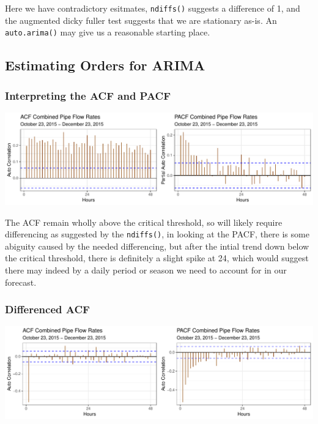 \documentclass[openany]{book}
\begin{document}
Here we have contradictory esitmates, \texttt{ndiffs()} suggests a
difference of 1, and the augmented dicky fuller test suggests that we
are stationary as-is. An \texttt{auto.arima()} may give us a reasonable
starting place.

\hypertarget{estimating-orders-for-arima}{%
\subsection{Estimating Orders for
ARIMA}\label{estimating-orders-for-arima}}

\hypertarget{interpreting-the-acf-and-pacf}{%
\subsubsection{Interpreting the ACF and
PACF}\label{interpreting-the-acf-and-pacf}}

\includegraphics{Group2_Project1_Fall2019_files/figure-latex/unnamed-chunk-20-1.pdf}

The ACF remain wholly above the critical threshold, so will likely
require differencing as suggested by the \texttt{ndiffs()}, in looking
at the PACF, there is some abiguity caused by the needed differencing,
but after the intial trend down below the critical threshold, there is
definitely a slight spike at 24, which would suggest there may indeed by
a daily period or season we need to account for in our forecast.

\hypertarget{differenced-acf}{%
\subsubsection{Differenced ACF}\label{differenced-acf}}

\includegraphics{Group2_Project1_Fall2019_files/figure-latex/unnamed-chunk-21-1.pdf}
\end{document}
